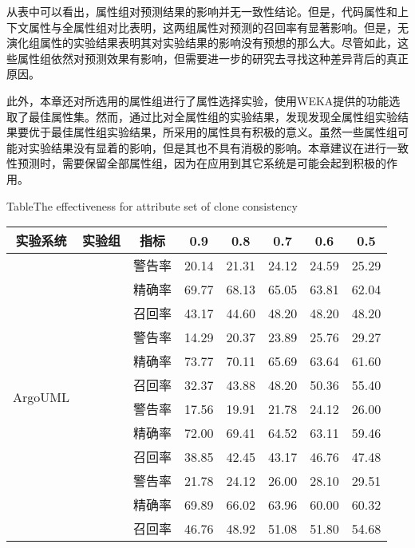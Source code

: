 从表中可以看出，属性组对预测结果的影响并无一致性结论。但是，代码属性和上下文属性与全属性组对比表明，这两组属性对预测的召回率有显著影响。但是，无演化组属性的实验结果表明其对实验结果的影响没有预想的那么大。尽管如此，这些属性组依然对预测效果有影响，但需要进一步的研究去寻找这种差异背后的真正原因。

此外，本章还对所选用的属性组进行了属性选择实验，使用WEKA提供的功能选取了最佳属性集。然而，通过比对全属性组的实验结果，发现发现全属性组实验结果要优于最佳属性组实验结果，所采用的属性具有积极的意义。虽然一些属性组可能对实验结果没有显着的影响，但是其也不具有消极的影响。本章建议在进行一致性预测时，需要保留全部属性组，因为在应用到其它系统是可能会起到积极的作用。

\begin{table} 
\renewcommand\arraystretch{0.65} 
{Table$\!$}{The effectiveness for attribute set of clone consistency}
\vspace{0.5em}
\centering
\wuhao
\begin{tabular}{cccccccc}
\toprule[1.5pt]
{实验系统}&{实验组}&{指标}&{0.9}&{0.8}&{0.7}&{0.6}&{0.5}\\
\midrule[1pt]
\multirow{12}{*}{ArgoUML}
&~\multirow{3}{*}{全部属性(\%)}
& 警告率       & 20.14 & 21.31 & 24.12 & 24.59 & 25.29 \\
& & 精确率       & 69.77 & 68.13 & 65.05 & 63.81 & 62.04 \\
& & 召回率       & 43.17 & 44.60 & 48.20 & 48.20 & 48.20 \\
\cline{2-8}
&~\multirow{3}{*}{无代码属性    (\%)}
& 警告率       & 14.29 & 20.37 & 23.89 & 25.76 & 29.27 \\
&   & 精确率       & 73.77 & 70.11 & 65.69 & 63.64 & 61.60 \\
 &  & 召回率       & 32.37 & 43.88 & 48.20 & 50.36 & 55.40 \\
 \cline{2-8}
&~\multirow{3}{*}{无上下文属性   (\%)}
&       警告率       & 17.56 & 19.91 & 21.78 & 24.12 & 26.00 \\
& & 精确率       & 72.00 & 69.41 & 64.52 & 63.11 & 59.46 \\
&             & 召回率       & 38.85 & 42.45 & 43.17 & 46.76 & 47.48 \\
\cline{2-8}
&~\multirow{3}{*}{无演化属性(\%)}
&    警告率       & 21.78 & 24.12 & 26.00 & 28.10 & 29.51 \\
&  & 精确率       & 69.89 & 66.02 & 63.96 & 60.00 & 60.32 \\
 &             & 召回率       & 46.76 & 48.92 & 51.08 & 51.80 & 54.68 \\

\end{tabular}
\end{table}
